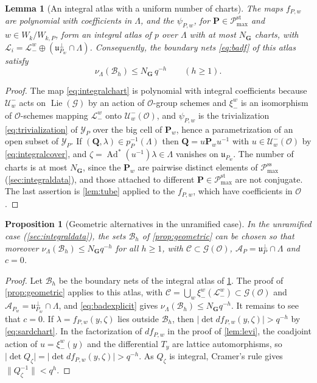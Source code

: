 \documentclass[11pt,reqno]{amsart}
\numberwithin{equation}{section}
\theoremstyle{plain}
\newtheorem{proposition}[theorem]{Proposition}
\newtheorem{lemma}[theorem]{Lemma}
\theoremstyle{definition}
\theoremstyle{remark}
\theoremstyle{plain}
\newcommand{\OO}{\mathcal{O}}    %
\newcommand{\Lat}{\mathcal{L}}   %
\newcommand{\dLat}{\Lambda}      %
\newcommand{\bG}{\mathbf{G}}     %
\newcommand{\bP}{\mathbf{P}}     %
\newcommand{\bQ}{\mathbf{Q}}     %
\newcommand{\g}{\mathfrak{g}}    %
\newcommand{\gd}{\mathfrak{g}^*} %
\newcommand{\uu}{\mathfrak{u}}   %
\newcommand{\Bad}{\mathcal{B}}   %
\newcommand{\bnets}{boundary nets}
\newcommand{\Pc}{\mathscr{P}^{\mathrm{st}}_{\mathrm{max}}}    %
\newcommand{\Pcss}{\mathscr{P}^{\mathrm{ss}}_{\mathrm{max}}}  %
\newcommand{\Nss}{N_{\bG}}  %
\newcommand{\cG}{\mathcal{G}}                   %
\newcommand{\cU}{\mathcal{U}}                   %
\newcommand{\abs}[1]{\lvert#1\rvert}
\newcommand{\norm}[1]{\lVert#1\rVert}
\DeclareMathOperator{\Ad}{Ad}
\DeclareMathOperator{\Lie}{Lie}
\newcommand{\lf}{\lambda}
\newcommand{\nf}{\zeta}
\newcommand{\Inc}{\mathcal{Y}}
\newcommand{\iatlas}{integral atlas}
\begin{document}
\begin{lemma}[An \iatlas{} with a uniform number of charts]\label{lem:integralatlas}
The maps $f_{P,w}$ are polynomial with coefficients
in $\dLat$, and the $\psi_{P,w}$, for $\bP\in\Pc$ and $w\in W_k/W_{k,P}$, form
an \iatlas{} of $p$ over $\dLat$ with at most $\Nss$ charts, with
$\Lat_i=\Lat^w_-\oplus(\uu_{P_w}^\perp\cap \dLat)$. Consequently, the
\bnets{} \eqref{eq:badf} of this atlas satisfy
\begin{equation}\label{eq:badexplicit}
\nu_{\dLat}(\Bad_h)\le \Nss\,q^{-h}\qquad(h\ge1).
\end{equation}
\end{lemma}

\begin{proof}
The map \eqref{eq:integralchart} is polynomial with integral
coefficients because $\cU^-_w$ acts on $\Lie(\cG)$ by an action of
$\OO$-group schemes and $\xi^w_-$ is an isomorphism of $\OO$-schemes
mapping $\Lat^w_-$ onto $\cU^-_w(\OO)$, and
$\psi_{P,w}$ is the trivialization \eqref{eq:trivialization} of $\Inc_P$ over the big cell of $\bP_w$, hence a parametrization of an open subset of $\Inc_P$. If
$(\bQ,\lf)\in p_P^{-1}(\dLat)$ then $\bQ=u\bP_wu^{-1}$ with $u\in\cU_w^-(\OO)$ by
\eqref{eq:integralcover}, and $\nf=\Ad^*(u^{-1})\lf\in \dLat$ vanishes on
$\uu_{P_w}$. The number of charts is at most $\Nss$, since the $\bP_w$ are
pairwise distinct elements of $\Pcss$ (\cref{sec:integraldata}), and those
attached to different $\bP\in\Pc$ are not conjugate. The last assertion is \cref{lem:tube} applied to the
$f_{P,w}$, which have coefficients in $\OO$.
\end{proof}

\begin{proposition}[Geometric alternatives in the unramified case]\label{prop:geometricunram}
In the unramified case (\cref{sec:integraldata}), the sets $\Bad_h$ of
\cref{prop:geometric} can be chosen so that moreover
$\nu_{\dLat}(\Bad_h)\le \Nss q^{-h}$ for all $h\ge1$, with $\mathcal C\subset\cG(\OO)$,
$\mathcal A_P=\uu_P^\perp\cap\dLat$ and $c=0$.
\end{proposition}

\begin{proof}
Let $\Bad_h$ be the \bnets{} of the \iatlas{} of \cref{lem:integralatlas}.
The proof of \cref{prop:geometric} applies to this atlas, with
$\mathcal C=\bigcup_w\xi_-^w(\Lat_-^w)\subset\cG(\OO)$ and
$\mathcal A_{P_w}=\uu_{P_w}^\perp\cap\dLat$, and \eqref{eq:badexplicit} gives
$\nu_{\dLat}(\Bad_h)\le \Nss q^{-h}$. It remains to see that $c=0$. If
$\lf=f_{P,w}(y,\nf)$ lies outside $\Bad_h$, then
$\abs{\det df_{P,w}(y,\nf)}>q^{-h}$ by \eqref{eq:sardchart}. In the
factorization of $df_{P,w}$ in the proof of \cref{lem:levi}, the coadjoint
action of $u=\xi_-^w(y)$ and the differential $T_y$ are lattice
automorphisms, so $\abs{\det Q_\nf}=\abs{\det df_{P,w}(y,\nf)}>q^{-h}$. As
$Q_\nf$ is integral, Cramer's rule gives $\norm{Q_\nf^{-1}}<q^h$.
\end{proof}
\end{document}
